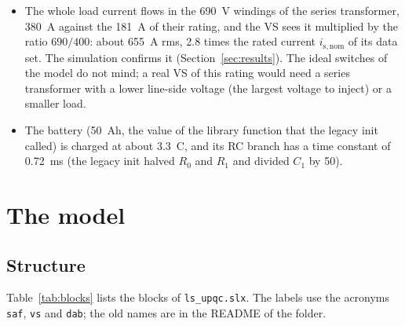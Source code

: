 \documentclass[11pt,a4paper]{scrartcl}
\newcommand{\ped}[1]{_{\mathrm{#1}}}
\newcommand{\code}[1]{\texttt{#1}}
\begin{document}
\begin{onehalfspace}
\begin{itemize}[nosep]
	\item The whole load current flows in the \SI{690}{V} windings of the series transformer, \SI{380}{A} against the \SI{181}{A} of their rating, and the VS sees it multiplied by the ratio $690/400$: about \SI{655}{A} rms, 2.8 times the rated current $i\ped{s,nom}$ of its data set. The simulation confirms it (Section~\ref{sec:results}). The ideal switches of the model do not mind; a real VS of this rating would need a series transformer with a lower line-side voltage (the largest voltage to inject) or a smaller load.
	\item The battery (\SI{50}{Ah}, the value of the library function that the legacy init called) is charged at about \SI{3.3}{C}, and its RC branch has a time constant of \SI{0.72}{ms} (the legacy init halved $R_0$ and $R_1$ and divided $C_1$ by 50).
\end{itemize}

\section{The model}
\label{sec:model}

\subsection{Structure}

Table~\ref{tab:blocks} lists the blocks of \code{ls\_upqc.slx}. The labels use the acronyms \code{saf}, \code{vs} and \code{dab}; the old names are in the README of the folder.


\end{onehalfspace}
\end{document}
